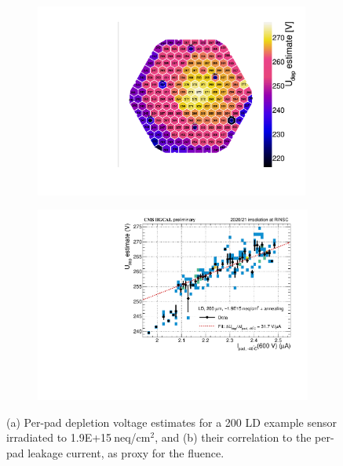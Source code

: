 \begin{figure}
	\captionsetup[subfigure]{aboveskip=-1pt,belowskip=-1pt}
	\centering
	\begin{subfigure}[b]{0.49\textwidth}
		\centering
		\includegraphics[width=0.99\textwidth]{plots/Vdep_hexplots/0541_04.pdf}
		\subcaption{
			}
			\label{plot:Vdep_hexplot_0541_04}
	\end{subfigure}
	\hfill
	\begin{subfigure}[b]{0.49\textwidth}
		\centering
		\includegraphics[width=0.999\textwidth]{plots/Vdep_vs_fluence/Vdep_vs_current_5414.pdf}
		\subcaption{
			}
			\label{plot:Vdep_vs_current_5414}
	\end{subfigure}
	\caption{
		(a) Per-pad depletion voltage estimates for a \SI{200}{\micron} LD example sensor irradiated to 1.9E+15$~$neq/cm$^{2}$, and 
		(b) their correlation to the per-pad leakage current, as proxy for the fluence.
	}
\end{figure}

